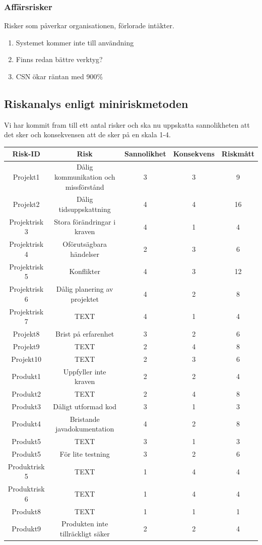 \documentclass{article}
\begin{document}
\subsubsection{Affärsrisker}
Risker som påverkar organisationen, förlorade intäkter.

\begin{enumerate}
    \item Systemet kommer inte till användning
    \item Finns redan bättre verktyg?
    \item CSN ökar räntan med 900\%
\end{enumerate}

\subsection{Riskanalys enligt miniriskmetoden}

Vi har kommit fram till ett antal risker och ska nu uppskatta sannolikheten att det sker och konsekvensen att de sker på en skala 1-4. 

\begin{tabular}{|c|c|c|c|c|}
\hline
Risk-ID & Risk & Sannolikhet & Konsekvens & Riskmått \\
\hline
   Projekt1 & Dålig kommunikation och missförstånd &  3 & 3 & 9 \\
   Projekt2 &  Dålig tidsuppskattning & 4 & 4 & 16 \\
   Projektrisk 3 & Stora förändringar i kraven &4 & 1 & 4 \\
   Projektrisk 4 & Oförutsägbara händelser & 2 & 3 & 6 \\
   Projektrisk 5 & Konflikter &4 & 3 & 12 \\
   Projektrisk 6 & Dålig planering av projektet & 4 & 2 & 8 \\
   Projektrisk 7 & TEXT & 4 & 1 & 4 \\
   Projekt8 & Brist på erfarenhet & 3 & 2 & 6 \\
    Projekt9 & TEXT & 2 & 4 & 8 \\
    Projekt10 & TEXT & 2 & 3 & 6 \\
   \hline
   Produkt1 & Uppfyller inte kraven & 2 & 2 & 4 \\
   Produkt2 & TEXT & 2 & 4 & 8 \\
   Produkt3 & Dåligt utformad kod & 3 & 1 & 3\\
   Produkt4 & Bristande javadokumentation & 4 & 2 & 8 \\
   Produkt5 & TEXT &  3 & 1 & 3 \\
   Produkt5 & För lite testning  & 3 & 2 & 6 \\
   Produktrisk 5 & TEXT & 1 & 4 & 4 \\
   Produktrisk 6 & TEXT & 1 & 4 & 4 \\
   Produkt8 & TEXT & 1 & 1 & 1 \\
Produkt9 & Produkten inte tillräckligt säker & 2 & 2 & 4 \\

\hline
\end{tabular}
\end{document}

